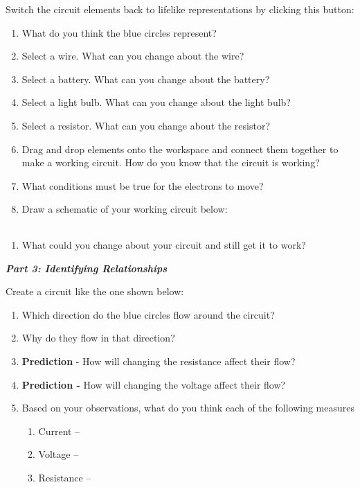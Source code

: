 \documentclass[11pt]{article}
\begin{document}
Switch the circuit elements back to lifelike representations by clicking
this button:

\begin{enumerate}
\def\labelenumi{\Alph{enumi}.}
\item
  What do you think the blue circles represent?
\item
  Select a wire. What can you change about the wire?
\item
  Select a battery. What can you change about the battery?
\item
  Select a light bulb. What can you change about the light bulb?
\item
  Select a resistor. What can you change about the resistor?
\item
  Drag and drop elements onto the workspace and connect them together to
  make a working circuit. How do you know that the circuit is working?
\item
  What conditions must be true for the electrons to move?
\item
  Draw a schematic of your working circuit below:
\end{enumerate}

\begin{longtable}[]{@{}l@{}}
\toprule
\bottomrule
\end{longtable}

\begin{enumerate}
\def\labelenumi{\Alph{enumi}.}
\item
  What could you change about your circuit and still get it to work?
\end{enumerate}

\textbf{\emph{Part 3: Identifying Relationships}}

Create a circuit like the one shown below:


\begin{enumerate}
\def\labelenumi{\Alph{enumi}.}
\item
  Which direction do the blue circles flow around the circuit?
\item
  Why do they flow in that direction?
\item
  \textbf{Prediction} - How will changing the resistance affect their
  flow?
\item
  \textbf{Prediction -} How will changing the voltage affect their flow?
\item
  Based on your observations, what do you think each of the following
  measures

  \begin{enumerate}
  \def\labelenumii{\roman{enumii}.}
  \item
    Current --
  \item
    Voltage --
  \item
    Resistance --
  \end{enumerate}
\end{enumerate}
\end{document}
